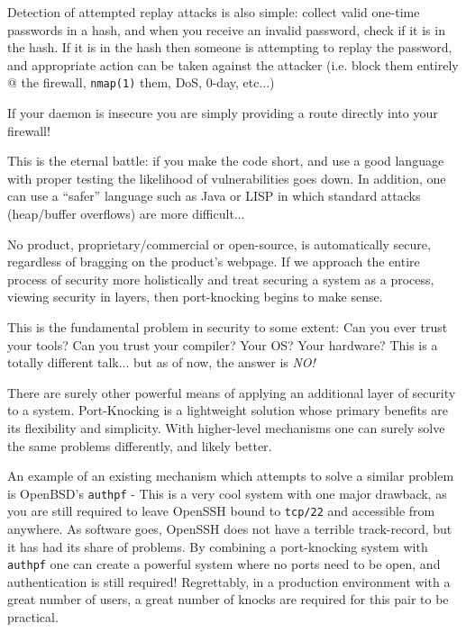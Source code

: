 \documentclass[landscape,twocolumn,headrule]{foils}
\begin{document}
Detection of attempted replay attacks is also simple: collect valid one-time passwords in a hash, and when you receive an invalid password, check if it is in the hash.  If it is in the hash then someone is attempting to replay the password, and appropriate action can be taken against the attacker (i.e. block them entirely @ the firewall, \texttt{nmap(1)} them, DoS, 0-day, etc...)

If your daemon is insecure you are simply providing a route directly into your firewall!

This is the eternal battle: if you make the code short, and use a good language with proper testing the likelihood of vulnerabilities goes down.  In addition, one can use a ``safer'' language such as Java or LISP in which standard attacks (heap/buffer overflows) are more difficult...


No product, proprietary/commercial or open-source, is automatically secure, regardless of bragging on the product's webpage.  If we approach the entire process of security more holistically and treat securing a system as a process, viewing security in layers, then port-knocking begins to make sense.

This is the fundamental problem in security to some extent: Can you ever trust your tools?  Can you trust your compiler?  Your OS?  Your hardware?  This is a totally different talk...  but as of now, the answer is \emph{NO!}

There are surely other powerful means of applying an additional layer of security to a system.  Port-Knocking is a lightweight solution whose primary benefits are its flexibility and simplicity.  With higher-level mechanisms one can surely solve the same problems differently, and likely better.

An example of an existing mechanism which attempts to solve a similar problem is OpenBSD's \texttt{authpf} - This is a very cool system with one major drawback, as you are still required to leave OpenSSH bound to \texttt{tcp/22} and accessible from anywhere.  As software goes, OpenSSH does not have a terrible track-record, but it has had its share of problems.  By combining a port-knocking system with \texttt{authpf} one can create a powerful system where no ports need to be open, and authentication is still required!  Regrettably, in a production environment with a great number of users, a great number of knocks are required for this pair to be practical.
\end{document}
